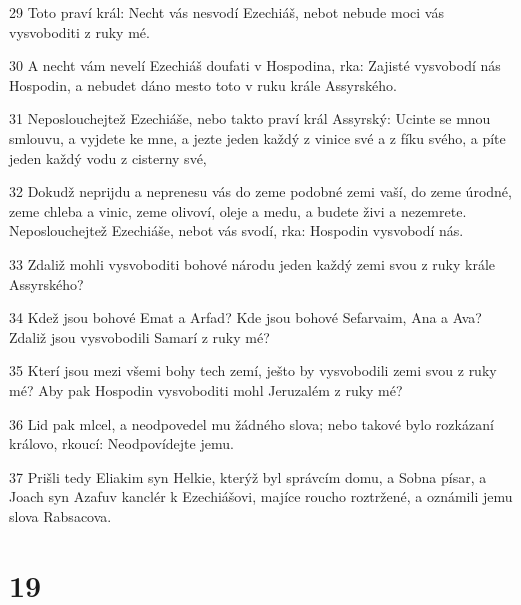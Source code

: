 \par 29 Toto praví král: Necht vás nesvodí Ezechiáš, nebot nebude moci vás vysvoboditi z ruky mé.
\par 30 A necht vám nevelí Ezechiáš doufati v Hospodina, rka: Zajisté vysvobodí nás Hospodin, a nebudet dáno mesto toto v ruku krále Assyrského.
\par 31 Neposlouchejtež Ezechiáše, nebo takto praví král Assyrský: Ucinte se mnou smlouvu, a vyjdete ke mne, a jezte jeden každý z vinice své a z fíku svého, a píte jeden každý vodu z cisterny své,
\par 32 Dokudž neprijdu a neprenesu vás do zeme podobné zemi vaší, do zeme úrodné, zeme chleba a vinic, zeme olivoví, oleje a medu, a budete živi a nezemrete. Neposlouchejtež Ezechiáše, nebot vás svodí, rka: Hospodin vysvobodí nás.
\par 33 Zdaliž mohli vysvoboditi bohové národu jeden každý zemi svou z ruky krále Assyrského?
\par 34 Kdež jsou bohové Emat a Arfad? Kde jsou bohové Sefarvaim, Ana a Ava? Zdaliž jsou vysvobodili Samarí z ruky mé?
\par 35 Kterí jsou mezi všemi bohy tech zemí, ješto by vysvobodili zemi svou z ruky mé? Aby pak Hospodin vysvoboditi mohl Jeruzalém z ruky mé?
\par 36 Lid pak mlcel, a neodpovedel mu žádného slova; nebo takové bylo rozkázaní královo, rkoucí: Neodpovídejte jemu.
\par 37 Prišli tedy Eliakim syn Helkie, kterýž byl správcím domu, a Sobna písar, a Joach syn Azafuv kanclér k Ezechiášovi, majíce roucho roztržené, a oznámili jemu slova Rabsacova.

\chapter{19}

